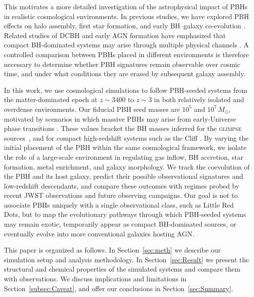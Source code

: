 \documentclass[twocolumn,trackchanges]{aastex701}
\begin{document}
This motivates a more detailed investigation of the astrophysical impact of PBHs in realistic cosmological environments. In previous studies, we have explored PBH effects on halo assembly, first star formation, and early BH--galaxy co-evolution \citep{LiuPBH2022MNRAS,ZhangPBH2024ApJ,ZhangPBH2024MNRAS,ZhangPBHGalaxy2025ApJ,ZhangDCBHPBH2025ApJ,Zhang2026PBHApJL}. Related studies of DCBH and early AGN formation have emphasized that compact BH-dominated systems may arise through multiple physical channels \citep{BrommDCBH2003ApJ...596...34B,JeonAGN2023,Hu2025,JeonSMBH2025ApJ...979..127J,JeonBHMF2025ApJ...988..110J,InayoshiLRD2024ApJ...973L..49I,InayoshiBinaryBH2026ApJ}. A controlled comparison between PBHs placed in different environments is therefore necessary to determine whether PBH signatures remain observable over cosmic time, and under what conditions they are erased by subsequent galaxy assembly.

In this work, we use cosmological simulations to follow PBH-seeded systems from the matter-dominated epoch at $z\sim3400$ to $z\sim3$ in both relatively isolated and overdense environments. Our fiducial PBH seed masses are $10^5$ and $10^7\,M_\odot$, motivated by scenarios in which massive PBHs may arise from early-Universe phase transitions \citep{Carr2021PDU....3100755C}. These values bracket the BH masses inferred for the \textsc{glimpse} sources~\citep{GLIMPSEBH2026ApJ}, and for compact high-redshift systems such as the Cliff \citep[$z\simeq3.5$;][]{Cliff2026MNRAS}.
 By varying the initial placement of the PBH within the same cosmological framework, we isolate the role of a large-scale environment in regulating gas inflow, BH accretion, star formation, metal enrichment, and galaxy morphology. We track the coevolution of the PBH and its host galaxy, predict their possible observational signatures and low-redshift descendants, and compare these outcomes with regimes probed by recent JWST observations and future observing campaigns. Our goal is not to associate PBHs uniquely with a single observational class, such as Little Red Dots, but to map the evolutionary pathways through which PBH-seeded systems may remain exotic, temporarily appear as compact BH-dominated sources, or eventually evolve into more conventional galaxies hosting AGN.


This paper is organized as follows. In Section~\ref{sec:meth} we describe our simulation setup and analysis methodology. In Section~\ref{sec:Result} we present the structural and chemical properties of the simulated systems and compare them with observations. We discuss implications and limitations in Section~\ref{subsec:Caveat}, and offer our conclusions in Section~\ref{sec:Summary}.
\end{document}
